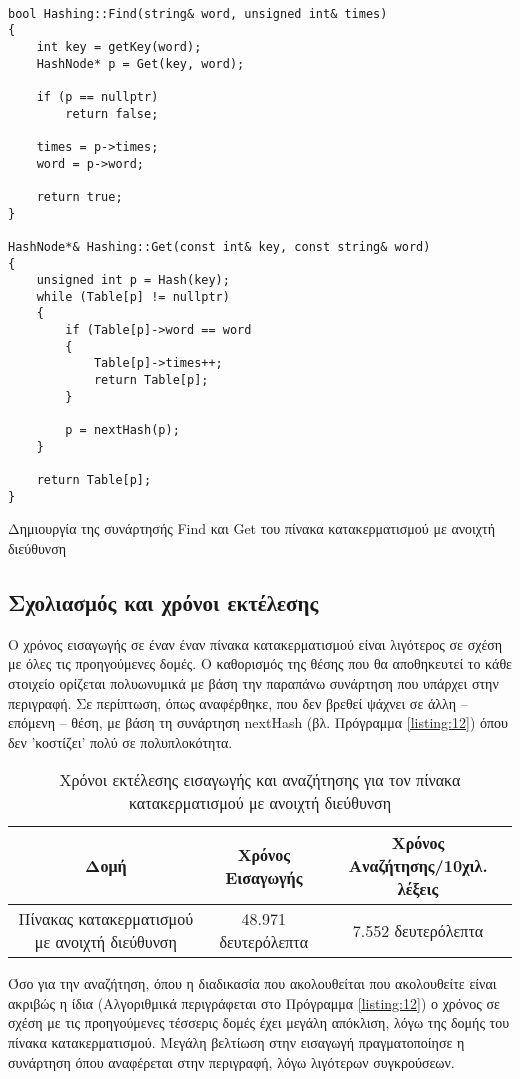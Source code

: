 \en
\begin{listing}[ht]
\begin{verbatim}

bool Hashing::Find(string& word, unsigned int& times)
{
    int key = getKey(word);
    HashNode* p = Get(key, word);

    if (p == nullptr)
        return false;

    times = p->times;
    word = p->word;

    return true;
}

HashNode*& Hashing::Get(const int& key, const string& word)
{
    unsigned int p = Hash(key);
    while (Table[p] != nullptr)
    {
        if (Table[p]->word == word
        {
            Table[p]->times++;
            return Table[p];
        }

        p = nextHash(p);
    }

    return Table[p];
}

\end{verbatim}
\caption{Δημιουργία της συνάρτησής \en Find \gr και \en Get \gr του πίνακα κατακερματισμού με ανοιχτή διεύθυνση}
\label{listing:12}
\end{listing}
\gr

\subsection{Σχολιασμός και χρόνοι εκτέλεσης}

Ο χρόνος εισαγωγής σε έναν έναν πίνακα κατακερματισμού είναι λιγότερος σε σχέση με όλες τις προηγούμενες δομές. Ο καθορισμός της θέσης που θα αποθηκευτεί το κάθε στοιχείο ορίζεται πολυωνυμικά με βάση την παραπάνω συνάρτηση που υπάρχει στην περιγραφή. Σε περίπτωση, όπως αναφέρθηκε, που δεν βρεθεί ψάχνει σε άλλη -- επόμενη -- θέση, με βάση τη συνάρτηση \en nextHash \gr (βλ. Πρόγραμμα \ref{listing:12}) όπου δεν 'κοστίζει' πολύ σε πολυπλοκότητα.

\gr
\begin{table}[!h]
\centering
\begin{tabular}{||c c c||} 
 \hline
 Δομή & Χρόνος Εισαγωγής & Χρόνος Αναζήτησης/10χιλ. λέξεις \\
 \hline\hline
  Πίνακας κατακερματισμού με ανοιχτή διεύθυνση & 48.971 δευτερόλεπτα & 7.552 δευτερόλεπτα \\
 \hline
\end{tabular}
\caption{Χρόνοι εκτέλεσης εισαγωγής και αναζήτησης για τον πίνακα κατακερματισμού με ανοιχτή διεύθυνση}
\label{table:5}
\end{table}

Όσο για την αναζήτηση, όπου η διαδικασία που ακολουθείται που ακολουθείτε είναι ακριβώς η ίδια (Αλγοριθμικά περιγράφεται στο Πρόγραμμα \ref{listing:12}) ο χρόνος σε σχέση με τις προηγούμενες τέσσερις δομές έχει μεγάλη απόκλιση, λόγω της δομής του πίνακα κατακερματισμού. Μεγάλη βελτίωση στην εισαγωγή πραγματοποίησε η συνάρτηση όπου αναφέρεται στην περιγραφή, λόγω λιγότερων συγκρούσεων. 